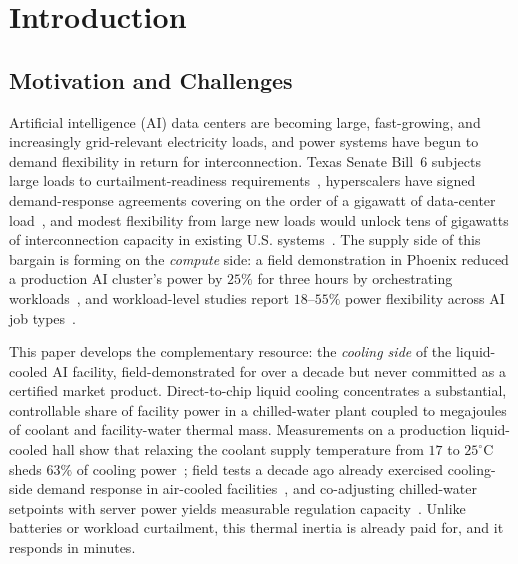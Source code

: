 \section{Introduction}
\label{sec:introduction}

\subsection{Motivation and Challenges}
\label{subsec:motivation}

Artificial intelligence (AI) data centers are becoming large, fast-growing,
and increasingly grid-relevant electricity loads, and power systems have begun
to demand flexibility in return for interconnection. Texas Senate Bill~6
subjects large loads to curtailment-readiness requirements~\cite{sb6_2025},
hyperscalers have signed demand-response agreements covering on the order of
a gigawatt of data-center load~\cite{google_dr2025}, and modest flexibility
from large new loads would unlock tens of gigawatts of interconnection
capacity in existing U.S. systems~\cite{norris2025rethinking}. The supply side of this bargain is
forming on the \emph{compute} side: a field demonstration in Phoenix reduced a
production AI cluster's power by $25\%$ for three hours by orchestrating
workloads~\cite{colangelo2025phoenix}, and workload-level studies report
$18$--$55\%$ power flexibility across AI job types~\cite{acun2026flexibility}.

This paper develops the complementary resource: the \emph{cooling side} of
the liquid-cooled AI facility, field-demonstrated for over a decade but
never committed as a certified market product. Direct-to-chip liquid cooling
concentrates a substantial, controllable share of facility power in a
chilled-water plant coupled to megajoules of coolant and facility-water
thermal mass. Measurements on a production liquid-cooled hall show that
relaxing the coolant supply temperature from $17$ to $25^\circ$C sheds $63\%$
of cooling power~\cite{gheni2026liquid}; field tests a decade ago already
exercised cooling-side demand response in air-cooled
facilities~\cite{ghatikar2012demand}, and co-adjusting chilled-water setpoints
with server power yields measurable regulation capacity~\cite{fu2020assessments}.
Unlike batteries or workload curtailment, this thermal inertia is already
paid for, and it responds in minutes.

